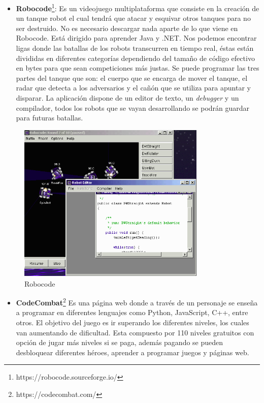 \begin{itemize}
\item \textbf{Robocode}\footnote{https://robocode.sourceforge.io/}: Es un videojuego multiplataforma que consiste en la creación de un tanque robot el cual tendrá que atacar y esquivar otros tanques para no ser destruido. No es necesario descargar nada aparte de lo que viene en Robocode. Está dirigido para aprender Java y .NET. Nos podemos encontrar ligas donde las batallas de los robots transcurren en tiempo real, éstas están divididas en diferentes categorías dependiendo del tamaño de código efectivo en bytes para que sean competiciones más justas. Se puede programar las tres partes del tanque que son: el cuerpo que se encarga de mover el tanque, el radar que detecta a los adversarios y el cañón que se utiliza para apuntar y disparar. La aplicación dispone de un editor de texto, un \textit{debugger} y un compilador, todos los robots que se vayan desarrollando se podrán guardar para futuras batallas\cite{app}.
\end{itemize}

\begin{figure}[H]
    \centering
    \includegraphics[width=9cm, keepaspectratio]{img/Robocode.png}
    \caption{Robocode}
    \label{fig:robocode}
\end{figure}

\begin{itemize}
\item \textbf{CodeCombat}\footnote{ https://codecombat.com/} Es una página web donde a través de un personaje se enseña a programar en diferentes lenguajes como Python, JavaScript, C++, entre otros. El objetivo del juego es ir superando los diferentes niveles, los cuales van aumentando de dificultad. Esta compuesto por 110 niveles gratuitos con opción de jugar más niveles si se paga, además pagando se pueden desbloquear diferentes héroes, aprender a programar juegos y páginas web\cite{app}.
\end{itemize}

